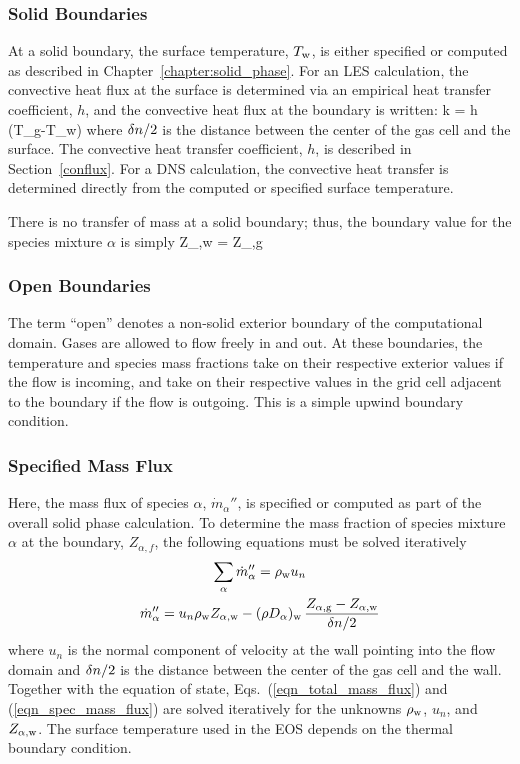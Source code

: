 \subsubsection{Solid Boundaries}

At a solid boundary, the surface temperature, $T_{\rm w}$, is either specified or computed as described in Chapter~\ref{chapter:solid_phase}. For an LES calculation, the convective heat flux at the surface is determined via an empirical heat transfer coefficient, $h$, and the convective heat flux at the boundary is written:
\be
   k  = h \; (T_{\rm g}-T_{\rm w})  \label{ebal}
\ee
where $\delta n/2$ is the distance between the center of the gas cell and the surface. The convective heat transfer coefficient, $h$, is described in Section~\ref{conflux}. For a DNS calculation, the convective heat transfer is determined directly from the computed or specified surface temperature.

There is no transfer of mass at a solid boundary; thus, the boundary value for the species mixture $\alpha$ is simply
\be Z_{\rm \alpha,w} = Z_{\rm \alpha,g} \ee

\subsubsection{Open Boundaries}

The term ``open'' denotes a non-solid exterior boundary of the computational domain. Gases are allowed to flow freely in and out. At these boundaries, the temperature and species mass fractions take on their respective exterior values if the flow is incoming, and take on their respective values in the grid cell adjacent to the boundary if the flow is outgoing. This is a simple upwind boundary condition.



\subsubsection{Specified Mass Flux}

Here, the mass flux of species $\alpha$, $\dot{m}_\alpha''$, is specified or computed as part of the overall solid phase calculation. To determine the mass fraction of species mixture $\alpha$ at the boundary, $Z_{\alpha,f}$, the following equations must be solved iteratively
\begin{gather}
\label{eqn_total_mass_flux} \sum_\alpha \dot{m}_\alpha'' = \rho_{\rm w} u_n \\
\label{eqn_spec_mass_flux}  \dot{m}_\alpha'' = u_n \rho_{\rm w} Z_{\rm \alpha,w} - (\rho D_\alpha)_{\rm w} \, \frac{Z_{\rm \alpha,g}-Z_{\rm \alpha,w}}{\delta n/2}
\end{gather}
where $u_n$ is the normal component of velocity at the wall pointing into the flow domain and $\delta n/2$ is the distance between the center of the gas cell and the wall. Together with the equation of state, Eqs.~(\ref{eqn_total_mass_flux}) and (\ref{eqn_spec_mass_flux}) are solved iteratively for the unknowns $\rho_{\rm w}$, $u_n$, and $Z_{\rm \alpha,w}$.  The surface temperature used in the EOS depends on the thermal boundary condition.


